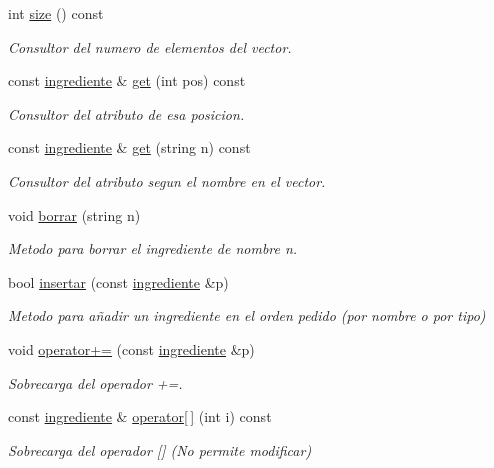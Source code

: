 \begin{DoxyCompactItemize}
int \hyperlink{classingredientes_aaf628d0360800484ae277fbb7aa2f81d}{size} () const
\begin{DoxyCompactList}\small\item\em Consultor del numero de elementos del vector. \end{DoxyCompactList}\item 
const \hyperlink{classingrediente}{ingrediente} \& \hyperlink{classingredientes_a2d4257359160b39365b1aac2ec6a1166}{get} (int pos) const
\begin{DoxyCompactList}\small\item\em Consultor del atributo de esa posicion. \end{DoxyCompactList}\item 
const \hyperlink{classingrediente}{ingrediente} \& \hyperlink{classingredientes_aae670bf5dc762313dff281c7c6aa1b4f}{get} (string n) const
\begin{DoxyCompactList}\small\item\em Consultor del atributo segun el nombre en el vector. \end{DoxyCompactList}\item 
void \hyperlink{classingredientes_a71bde8efdf96c22f0f27ab9cc6e50466}{borrar} (string n)
\begin{DoxyCompactList}\small\item\em Metodo para borrar el ingrediente de nombre n. \end{DoxyCompactList}\item 
bool \hyperlink{classingredientes_a7633d03cdda31180994b63090ff9dd11}{insertar} (const \hyperlink{classingrediente}{ingrediente} \&p)
\begin{DoxyCompactList}\small\item\em Metodo para añadir un ingrediente en el orden pedido (por nombre o por tipo) \end{DoxyCompactList}\item 
void \hyperlink{classingredientes_a24ea8c982877578bff6e0f450c4b79a6}{operator+=} (const \hyperlink{classingrediente}{ingrediente} \&p)
\begin{DoxyCompactList}\small\item\em Sobrecarga del operador +=. \end{DoxyCompactList}\item 
const \hyperlink{classingrediente}{ingrediente} \& \hyperlink{classingredientes_a4d26f4035049ca7fb9506df48895cc4f}{operator\mbox{[}$\,$\mbox{]}} (int i) const
\begin{DoxyCompactList}\small\item\em Sobrecarga del operador \mbox{[}\mbox{]} (No permite modificar) \end{DoxyCompactList}\item 

\end{DoxyCompactItemize}

